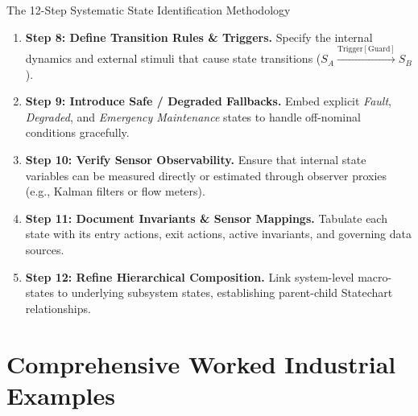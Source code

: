 \begin{checklistbox}{The 12-Step Systematic State Identification Methodology}
\begin{enumerate}[leftmargin=2em, itemsep=3pt]
    \item \textbf{Step 8: Define Transition Rules \& Triggers.} Specify the internal dynamics and external stimuli that cause state transitions ($S_A \xrightarrow{\text{Trigger}[\text{Guard}]} S_B$).
    \item \textbf{Step 9: Introduce Safe / Degraded Fallbacks.} Embed explicit \textit{Fault}, \textit{Degraded}, and \textit{Emergency Maintenance} states to handle off-nominal conditions gracefully.
    \item \textbf{Step 10: Verify Sensor Observability.} Ensure that internal state variables can be measured directly or estimated through observer proxies (e.g., Kalman filters or flow meters).
    \item \textbf{Step 11: Document Invariants \& Sensor Mappings.} Tabulate each state with its entry actions, exit actions, active invariants, and governing data sources.
    \item \textbf{Step 12: Refine Hierarchical Composition.} Link system-level macro-states to underlying subsystem states, establishing parent-child Statechart relationships.
\end{enumerate}
\end{checklistbox}

\section{Comprehensive Worked Industrial Examples}
\label{sec:worked_examples_day2}

